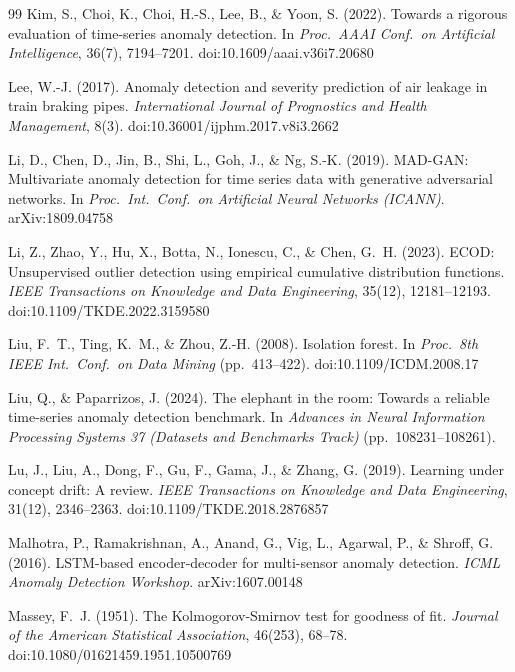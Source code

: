 \documentclass[11pt]{article}
\begin{document}
\begin{thebibliography}{99}
 Kim, S., Choi, K., Choi, H.-S., Lee, B., \& Yoon, S. (2022). Towards a rigorous evaluation of time-series anomaly detection. In \emph{Proc.\ AAAI Conf.\ on Artificial Intelligence}, 36(7), 7194--7201. doi:10.1609/aaai.v36i7.20680

 Lee, W.-J. (2017). Anomaly detection and severity prediction of air leakage in train braking pipes. \emph{International Journal of Prognostics and Health Management}, 8(3). doi:10.36001/ijphm.2017.v8i3.2662

 Li, D., Chen, D., Jin, B., Shi, L., Goh, J., \& Ng, S.-K. (2019). MAD-GAN: Multivariate anomaly detection for time series data with generative adversarial networks. In \emph{Proc.\ Int.\ Conf.\ on Artificial Neural Networks (ICANN)}. arXiv:1809.04758

 Li, Z., Zhao, Y., Hu, X., Botta, N., Ionescu, C., \& Chen, G.~H. (2023). ECOD: Unsupervised outlier detection using empirical cumulative distribution functions. \emph{IEEE Transactions on Knowledge and Data Engineering}, 35(12), 12181--12193. doi:10.1109/TKDE.2022.3159580

 Liu, F.~T., Ting, K.~M., \& Zhou, Z.-H. (2008). Isolation forest. In \emph{Proc.\ 8th IEEE Int.\ Conf.\ on Data Mining} (pp.\ 413--422). doi:10.1109/ICDM.2008.17

 Liu, Q., \& Paparrizos, J. (2024). The elephant in the room: Towards a reliable time-series anomaly detection benchmark. In \emph{Advances in Neural Information Processing Systems 37 (Datasets and Benchmarks Track)} (pp.\ 108231--108261).

 Lu, J., Liu, A., Dong, F., Gu, F., Gama, J., \& Zhang, G. (2019). Learning under concept drift: A review. \emph{IEEE Transactions on Knowledge and Data Engineering}, 31(12), 2346--2363. doi:10.1109/TKDE.2018.2876857

 Malhotra, P., Ramakrishnan, A., Anand, G., Vig, L., Agarwal, P., \& Shroff, G. (2016). LSTM-based encoder-decoder for multi-sensor anomaly detection. \emph{ICML Anomaly Detection Workshop}. arXiv:1607.00148

 Massey, F.~J. (1951). The Kolmogorov-Smirnov test for goodness of fit. \emph{Journal of the American Statistical Association}, 46(253), 68--78. doi:10.1080/01621459.1951.10500769


\end{thebibliography}
\end{document}
